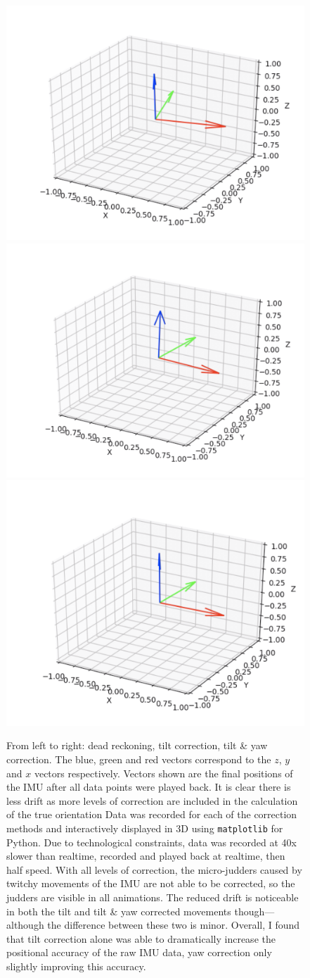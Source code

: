 \documentclass[11pt]{article}
\begin{document}
\begin{figure}[htp]

\centering
\includegraphics[width=.32\textwidth]{4gyro_after}\hfill
\includegraphics[width=.32\textwidth]{5acc_after}\hfill
\includegraphics[width=.32\textwidth]{6mag_after}

\caption{From left to right: dead reckoning, tilt correction, tilt \& yaw correction. The blue, green and red vectors correspond to the $z$, $y$ and $x$ vectors respectively. Vectors shown are the final positions of the IMU after all data points were played back. It is clear there is less drift as more levels of correction are included in the calculation of the true orientation Data was recorded for each of the correction methods and interactively displayed in 3D using \texttt{matplotlib} for Python. Due to technological constraints, data was recorded at 40x slower than realtime, recorded and played back at realtime, then half speed. With all levels of correction, the micro-judders caused by twitchy movements of the IMU are not able to be corrected, so the judders are visible in all animations. The reduced drift is noticeable in both the tilt and tilt \& yaw corrected movements though---although the difference between these two is minor. Overall, I found that tilt correction alone was able to dramatically increase the positional accuracy of the raw IMU data, yaw correction only slightly improving this accuracy. }
\label{fig:euler-angles}

\end{figure}
\end{document}
